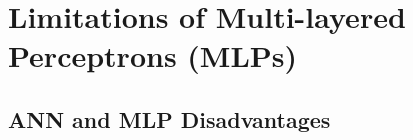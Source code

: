 \documentclass{article}
\begin{document}

\section{Limitations of Multi-layered Perceptrons (MLPs)}

\subsection{ANN and MLP Disadvantages}
\end{document}
